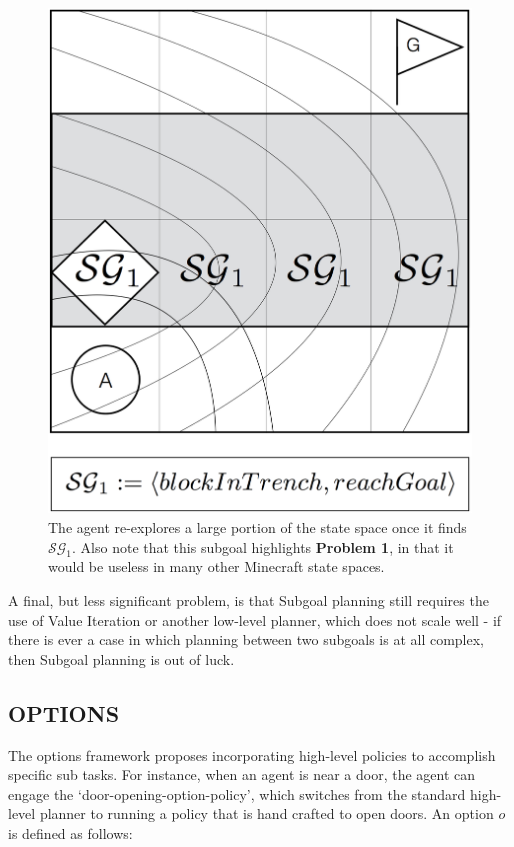 \documentclass[]{article}
\begin{document}
\begin{figure}
\centering
\includegraphics[scale=0.22]{figures/bridgeworld_sg.png}
\caption{The agent re-explores a large portion of the state space 
once it finds $\mathcal{SG}_1$. Also note that this subgoal 
highlights {\bf Problem 1}, in that it would be useless in many other Minecraft state spaces.}
\label{fig:bwsg}
\end{figure}


A final, but less significant problem, is that Subgoal planning still 
requires the use of Value Iteration or another low-level planner, which does not scale well - if 
there is ever a case in which planning between two subgoals is 
at all complex, then Subgoal planning is out of luck.

\subsection{OPTIONS}

The options framework proposes incorporating high-level policies to 
accomplish specific sub tasks. For instance, when an agent is near 
a door, the agent can engage the `door-opening-option-policy', which 
switches from the standard high-level planner to running a policy 
that is hand crafted to open doors. An option $o$ is defined as follows:
\end{document}
